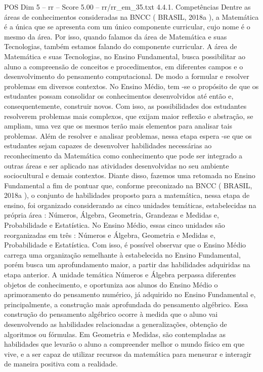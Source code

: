 \begin{textsample}{POS Dim 5 – rr – Score 5.00 – rr/rr\_em\_35.txt}  \label{ex:f5_pos_224}
4.4.1.
Competências Dentre as áreas de conhecimentos consideradas na BNCC ( BRASIL, 2018a ), a Matemática é a única que se apresenta com um único componente curricular, cujo nome é o mesmo da área.
Por isso, quando falamos da área de Matemática e suas Tecnologias, também estamos falando do componente curricular.
A área de Matemática e suas Tecnologias, no Ensino Fundamental, busca possibilitar ao aluno a compreensão de conceitos e procedimentos, em diferentes campos e o desenvolvimento do pensamento computacional.
De modo a formular e resolver problemas em diversos contextos.
No Ensino Médio, tem -se o propósito de que os estudantes possam consolidar os conhecimentos desenvolvidos até então e, consequentemente, construir novos.
Com isso, as possibilidades dos estudantes resolverem problemas mais complexos, que exijam maior reflexão e abstração, se ampliam, uma vez que os mesmos terão mais elementos para analisar tais problemas.
Além de resolver e analisar problemas, nessa etapa espera -se que os estudantes sejam capazes de desenvolver habilidades necessárias ao reconhecimento da Matemática como conhecimento que pode ser integrado a outras áreas e ser aplicado nas atividades desenvolvidas no seu ambiente sociocultural e demais contextos.
Diante disso, fazemos uma retomada no Ensino Fundamental a fim de pontuar que, conforme preconizado na BNCC ( BRASIL, 2018a ), o conjunto de habilidades proposto para a matemática, nessa etapa de ensino, foi organizado considerando as cinco unidades temáticas, estabelecidas na própria área : Números, Álgebra, Geometria, Grandezas e Medidas e, Probabilidade e Estatística.
No Ensino Médio, essas cinco unidades são reorganizadas em três : Números e Álgebra, Geometria e Medidas e, Probabilidade e Estatística.
Com isso, é possível observar que o Ensino Médio carrega uma organização semelhante à estabelecida no Ensino Fundamental, porém busca um aprofundamento maior, a partir das habilidades adquiridas na etapa anterior.
A unidade temática Números e Álgebra perpassa diferentes objetos de conhecimento, e oportuniza aos alunos do Ensino Médio o aprimoramento do pensamento numérico, já adquirido no Ensino Fundamental e, principalmente, a construção mais aprofundada do pensamento algébrico.
Essa construção do pensamento algébrico ocorre à medida que o aluno vai desenvolvendo as habilidades relacionadas a generalizações, obtenção de algoritmos ou fórmulas.
Em Geometria e Medidas, são contempladas as habilidades que levarão o aluno a compreender melhor o mundo físico em que vive, e a ser capaz de utilizar recursos da matemática para mensurar e interagir de maneira positiva com a realidade.

\end{textsample}
